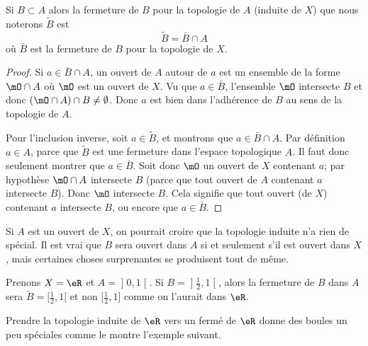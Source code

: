 \begin{lemma}       \label{LemkUYkQt}
    Si \( B\subset A\) alors la fermeture de \( B\) pour la topologie de \( A\) (induite de \( X\)) que nous noterons \( \tilde B\) est
    \begin{equation}
        \tilde B=\bar B\cap A
    \end{equation}
    où \( \bar B\) est la fermeture de \( B\) pour la topologie de \( X\).
\end{lemma}

\begin{proof}
    Si \( a\in \bar B\cap A\), un ouvert de \( A\) autour de \( a\) est un ensemble de la forme \( \mO\cap A\) où \( \mO\) est un ouvert de \( X\). Vu que \( a\in\bar B\), l'ensemble \( \mO\) intersecte \( B\) et donc \( (\mO\cap A)\cap B\neq \emptyset\). Donc \( a\) est bien dans l'adhérence de \( B\) au sens de la topologie de \( A\).

    Pour l'inclusion inverse, soit \( a\in \tilde  B\), et montrons que \( a\in \bar B\cap A\). Par définition \( a\in A\), parce que \( \tilde B\) est une fermeture dans l'espace topologique \( A\). Il faut donc seulement montrer que \( a\in\bar B\). Soit donc \( \mO\) un ouvert de \( X\) contenant \( a\); par hypothèse \( \mO\cap A\) intersecte \( B\) (parce que tout ouvert de \( A\) contenant \( a\) intersecte \( B\)). Donc \( \mO\) intersecte \( B\). Cela signifie que tout ouvert (de \( X\)) contenant \( a\) intersecte \( B\), ou encore que \( a\in \bar B\).
\end{proof}

Si \( A\) est un ouvert de \( X\), on pourrait croire que la topologie induite n'a rien de spécial. Il est vrai que \( B\) sera ouvert dans \( A\) si et seulement s'il est ouvert dans \( X\), mais certaines choses surprenantes se produisent tout de même.

\begin{example} \label{ExloeyoR}
Prenons \( X=\eR\) et \( A=\mathopen] 0 , 1 \mathclose[\). Si \( B=\mathopen] \frac{ 1 }{2} , 1 \mathclose[ \), alors la fermeture de \( B\) dans \( A\) sera \( \tilde B=\mathopen[ \frac{ 1 }{2} , 1 [\) et non \( \mathopen[ \frac{ 1 }{2} , 1 \mathclose]\) comme on l'aurait dans \( \eR\).
\end{example}

Prendre la topologie induite de \( \eR\) vers un fermé de \( \eR\) donne des boules un peu spéciales comme le montre l'exemple suivant.

